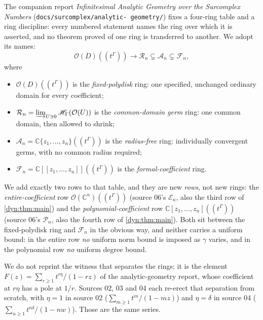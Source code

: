 \documentclass[11pt,letterpaper]{article}
\theoremstyle{definition}
\theoremstyle{remark}
\newcommand{\C}{\mathbb C}
\newcommand{\HH}{\mathscr H}
\newcommand{\OO}{\mathcal O}
\newcommand{\EE}{\mathscr E}
\newcommand{\PP}{\mathscr P}
\numberwithin{equation}{section}
\begin{document}
The companion report \emph{Infinitesimal Analytic Geometry over the
Surcomplex Numbers}
(\texttt{docs/\allowbreak surcomplex/\allowbreak analytic-\allowbreak
geometry/}) fixes a
four-ring table and a ring discipline: every numbered statement names the
ring over which it is asserted, and no theorem proved of one ring is
transferred to another. We adopt its names:
\begin{equation}\label{dyn:eq:rings}
 \OO(D)((t^{\Gamma}))\longrightarrow
 \mathcal R_n\subsetneq\mathcal A_n\subsetneq\mathcal F_n ,
\end{equation}
where
\begin{itemize}
\item $\OO(D)((t^{\Gamma}))$ is the \emph{fixed-polydisk} ring: one
specified, unchanged ordinary domain for every coefficient;
\item $\mathcal R_n=\varinjlim_{U\ni0}\HH_\Gamma(\OO(U))$ is the
\emph{common-domain germ} ring: one common domain, then allowed to shrink;
\item $\mathcal A_n=\C\{z_1,\dots,z_n\}((t^{\Gamma}))$ is the
\emph{radius-free} ring: individually convergent germs, with no common
radius required;
\item $\mathcal F_n=\C[[z_1,\dots,z_n]]((t^{\Gamma}))$ is the
\emph{formal-coefficient} ring.
\end{itemize}
We add exactly two rows to that table, and they are new \emph{rows}, not
new rings: the \emph{entire-coefficient} row $\OO(\C^{n})((t^{\Gamma}))$
(source 06's $\EE_n$, also the third row of \cref{dyn:thm:main}) and the
\emph{polynomial-coefficient} row $\C[z_1,\dots,z_n]((t^{\Gamma}))$
(source 06's $\PP_n$, also the fourth row of \cref{dyn:thm:main}). Both sit
between the fixed-polydisk ring and $\mathcal F_n$ in the obvious way, and
neither carries a uniform bound: in the entire row \emph{no} uniform norm
bound is imposed as $\gamma$ varies, and in the polynomial row \emph{no}
uniform degree bound.

We do not reprint the witness that separates the rings; it is the element
$F(z)=\sum_{r\ge1}t^{r\eta}/(1-rz)$ of the analytic-geometry report, whose
coefficient at $r\eta$ has a pole at $1/r$. Sources 02, 03 and 04 each
re-erect that separation from scratch, with $\eta=1$ in source 02
($\sum_{m\ge1}t^{m}/(1-mz)$) and $\eta=\delta$ in source 04
($\sum_{n\ge1}t^{n\delta}/(1-nw)$). Those are the same series.
\end{document}
